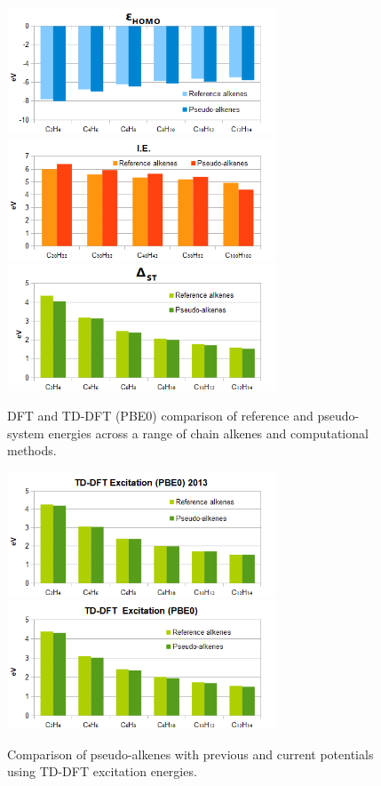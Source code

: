 \documentclass[journal=jctcce,manuscript=article]{achemso}
\begin{document}
\begin{figure}[h]
\includegraphics[width=8cm]{pbe0_homo}
\includegraphics[width=8cm]{pbe0_ionisation}
\includegraphics[width=8cm]{pbe0_excitation}
\caption{DFT and TD-DFT (PBE0) comparison of reference and pseudo-system energies across a range of chain alkenes and computational methods.}
\label{fig:alkenes_hf_dft}
\end{figure}
\begin{figure}[h]
\includegraphics[width=8cm]{tddft_excitation_cd}
\includegraphics[width=8cm]{tddft_excitation}
\caption{Comparison of pseudo-alkenes with previous\cite{drujon_pseudopotentials_2013} and current potentials using TD-DFT excitation energies.}
\label{fig:alkenes_tddft}
\end{figure}
\end{document}
